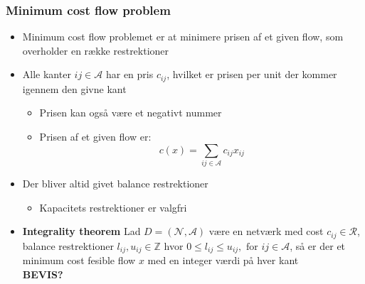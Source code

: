 \subsubsection{Minimum cost flow problem}
\begin{itemize}
	\item Minimum cost flow problemet er at minimere prisen af et given flow, som overholder en række restrektioner
  \item Alle kanter $ij \in \mathcal A$ har en pris $c_{ij}$, hvilket er prisen per unit der kommer igennem den givne kant
  \begin{itemize}
    \item Prisen kan også være et negativt nummer
    \item Prisen af et given flow er:
    \begin{equation*}
      c(x) = \sum_{ij \in \mathcal A} c_{ij}x_{ij} 
    \end{equation*}
  \end{itemize}
  \item Der bliver altid givet balance restrektioner
  \begin{itemize}
  	\item Kapacitets restrektioner er valgfri
  \end{itemize}
  \item \textbf{Integrality theorem} Lad $D=(\mathcal N, \mathcal A)$ være en netværk med cost $c_{ij} \in \mathcal R$, balance restrektioner $l_{ij}, u_{ij} \in \mathbb Z$ hvor $0 \leq l_{ij} \leq u_{ij}, \text{ for } ij \in \mathcal A$, så er der et minimum cost fesible flow $x$ med en integer værdi på hver kant \\
  \textbf{BEVIS?}
\end{itemize}


